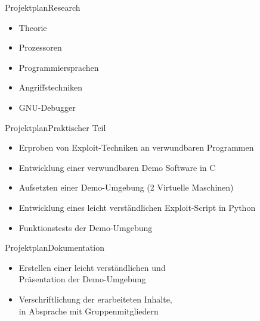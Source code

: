 \begin{frame}{Projektplan}{Research}
    \begin{itemize}
        \item Theorie
        \item Prozessoren
        \item Programmiersprachen
        \item Angriffstechniken
        \item GNU-Debugger
    \end{itemize}
\end{frame}

\begin{frame}{Projektplan}{Praktischer Teil}
    \begin{itemize}
        \item Erproben von Exploit-Techniken an verwundbaren Programmen
        \item Entwicklung einer verwundbaren Demo Software in C
        \item Aufsetzten einer Demo-Umgebung (2 Virtuelle Maschinen)
        \item Entwicklung eines leicht verständlichen Exploit-Script in Python
        \item Funktionstests der Demo-Umgebung
    \end{itemize}
\end{frame}

\begin{frame}{Projektplan}{Dokumentation}
    \begin{itemize}
        \item Erstellen einer leicht verständlichen und \\ Präsentation der Demo-Umgebung \\        
        \item Verschriftlichung der erarbeiteten Inhalte, \\ in Absprache mit Gruppenmitgliedern
    \end{itemize}
\end{frame}

